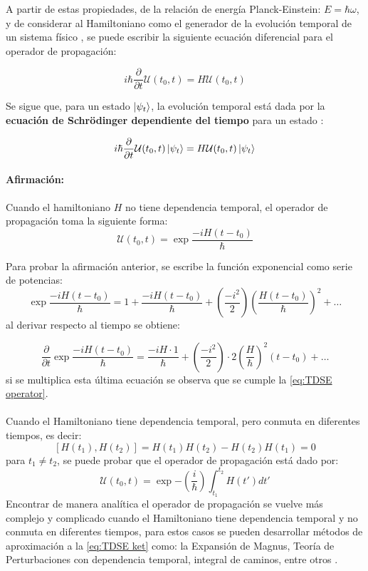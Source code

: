 A partir de estas propiedades, de la relación de energía Planck-Einstein: $E=\hbar\omega$, y de considerar al Hamiltoniano como el generador de la evolución temporal de un sistema físico \cite{Sakurai:1994}, se puede escribir la siguiente ecuación diferencial para el operador de propagación:

\begin{equation}
  \label{eq:TDSE operator}
  i\hbar\frac{\partial}{\partial t}\mathcal{U}(t_0,t) = H\mathcal{U}(t_0,t)
\end{equation}

Se sigue que, para un estado $\ket{\psi_{t}}$, la evolución temporal está dada por la \textbf{ecuación de Schrödinger dependiente del tiempo} para un estado \cite{Tannor:2006}:

\begin{tcolorbox}[colback=CTtitle!5!white,colframe=CTtitle!85!white]%
\begin{equation}
\label{eq:TDSE ket}
i\hbar\frac{\partial}{\partial t}\mathcal{U}(t_0,t)\ket{\psi_{t}} = H\mathcal{U}(t_0,t)\ket{\psi_{t}}
\end{equation}
\end{tcolorbox}

\paragraph{Afirmación:}
  Cuando el hamiltoniano $H$ no tiene dependencia temporal, el operador de propagación toma la siguiente forma:
\begin{equation}
\label{eq:U IT}
\mathcal{U}(t_0,t) = \exp{\frac{-iH(t-t_0)}{\hbar}}
\end{equation}

Para probar la afirmación anterior, se escribe la función exponencial como serie de potencias:
$$\exp{\frac{-iH(t-t_0)}{\hbar}} = 1 + \frac{-iH(t-t_0)}{\hbar}+ \left(\frac{-i^2}{2}\right)\left(\frac{H(t-t_0)}{\hbar}\right)^2+\dots $$
al derivar respecto al tiempo se obtiene:

$$\frac{\partial}{\partial t}\exp{\frac{-iH(t-t_0)}{\hbar}} = \frac{-iH\cdot 1}{\hbar}+ \left(\frac{-i^2}{2}\right)\cdot 2\left(\frac{H}{\hbar}\right)^2(t-t_0)+\dots $$
si se multiplica esta última ecuación se observa que se cumple la \autoref{eq:TDSE operator}.
\\\\
Cuando el Hamiltoniano tiene dependencia temporal, pero conmuta en diferentes tiempos, es decir:
$$[H(t_1), H(t_2)] = H(t_1)H(t_2) - H(t_2)H(t_1)=0$$
para $t_1 \neq t_2$, se puede probar que el operador de propagación está dado por:
$$\mathcal{U}(t_0,t) = \exp{-\left( \frac{i}{\hbar}\right)\int_{t_1}^{t_2}H(t')dt'}$$
Encontrar de manera analítica el operador de propagación se vuelve más complejo y complicado cuando el Hamiltoniano tiene dependencia temporal y no conmuta en diferentes tiempos, para estos casos se pueden desarrollar métodos de aproximación a la \autoref{eq:TDSE ket} como: la Expansión de Magnus, Teoría de Perturbaciones con dependencia temporal, integral de caminos, entre otros \cite{Begzjav2020,Picasso2012}.


